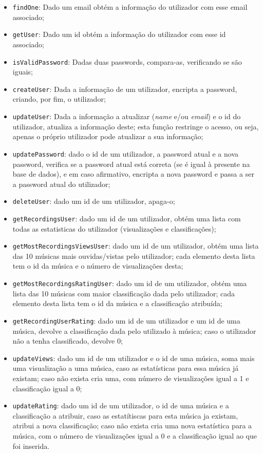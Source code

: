 \documentclass{article}
\begin{document}
    \begin{itemize}
        \item \texttt{findOne}: Dado um email obtém a informação do utilizador com esse email associado;
        \item \texttt{getUser}: Dado um id obtém a informação do utilizador com esse id associado;
        \item \texttt{isValidPassword}: Dadas duas passwords, compara-as, verificando se são iguais;
        \item \texttt{createUser}: Dada a informação de um utilizador, encripta a password, criando, por fim, o utilizador;
        \item \texttt{updateUser}: Dada a informação a atualizar (\textit{name} e/ou \textit{email}) e o id do utilizador, atualiza a informação deste; esta função restringe o acesso, ou seja, apenas o próprio utilizador pode atualizar a sua informação;
        \item \texttt{updatePassword}: dado o id de um utilizador, a password atual e a nova password, verifica se a password atual está correta (se é igual à presente na base de dados), e em caso afirmativo, encripta a nova password e passa a ser a password atual do utilizador;
        \item \texttt{deleteUser}: dado um id de um utilizador, apaga-o;
        \item \texttt{getRecordingsUser}: dado um id de um utilizador, obtém uma lista com todas as estatisticas do utilizador (visualizações e classificações);
        \item \texttt{getMostRecordingsViewsUser}: dado um id de um utilizador, obtém uma lista das 10 músicas mais ouvidas/vistas pelo utilizador; cada elemento desta lista tem o id da música e o número de visualizações desta;
        \item \texttt{getMostRecordingsRatingUser}: dado um id de um utilizador, obtém uma lista das 10 músicas com maior classificação dada pelo utilizador; cada elemento desta lista tem o id da música e a classificação atribuída;
        \item \texttt{getRecordingUserRating}: dado um id de um utilizador e um id de uma música, devolve a classificação dada pelo utilizado à música; caso o utilizador não a tenha classificado, devolve 0;
        \item \texttt{updateViews}: dado um id de um utilizador e o id de uma música, soma mais uma visualização a uma música, caso as estatísticas para essa música já existam; caso não exista cria uma, com número de visualizações igual a 1 e classificação igual a 0;
        \item \texttt{updateRating}: dado um id de um utilizador, o id de uma música e a classificação a atribuir, caso as estatítiscas para esta música ja existam, atribui a nova classificação; caso não exista cria uma nova estatística para a música, com o número de visualizações igual a 0 e a classificação igual ao que foi inserida.
    \end{itemize}
\end{document}
